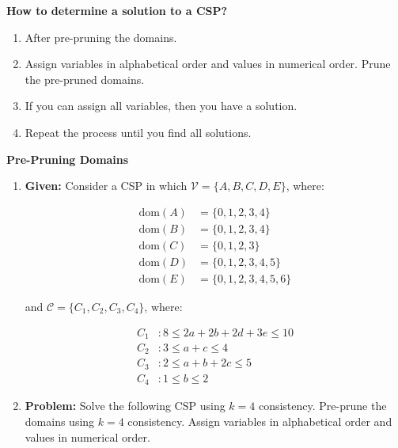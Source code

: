 \begin{process} \textbf{How to determine a solution to a CSP?}
    \begin{enumerate}
        \item After pre-pruning the domains. 
        \item Assign variables in alphabetical order and values in numerical order. Prune the pre-pruned domains.
        \item If you can assign all variables, then you have a solution.
        \item Repeat the process until you find all solutions. 
    \end{enumerate}
\end{process}
\newpage

\begin{example} \textbf{Pre-Pruning Domains}
\end{example}
\newpage

\begin{example}
    \begin{enumerate}
        \item \textbf{Given:} Consider a CSP in which $\mathcal{V} = \{A, B, C, D, E\}$, where:

        \[
        \begin{aligned}
            \text{dom}(A) &= \{0, 1, 2, 3, 4\} \\
            \text{dom}(B) &= \{0, 1, 2, 3, 4\} \\
            \text{dom}(C) &= \{0, 1, 2, 3\} \\
            \text{dom}(D) &= \{0, 1, 2, 3, 4, 5\} \\
            \text{dom}(E) &= \{0, 1, 2, 3, 4, 5, 6\} 
        \end{aligned}
        \]
        
        and $\mathcal{C} = \{C_1, C_2, C_3, C_4\}$, where:
        
        \[
        \begin{aligned}
            C_1 &: 8 \leq 2a + 2b + 2d + 3e \leq 10 \\
            C_2 &: 3 \leq a + c \leq 4 \\
            C_3 &: 2 \leq a + b + 2c \leq 5 \\
            C_4 &: 1 \leq b \leq 2
        \end{aligned}
        \]
        
        \item \textbf{Problem:} Solve the following CSP using $k = 4$ consistency. Pre-prune the domains using $k = 4$ consistency. Assign variables in alphabetical order and values in numerical order.
    \end{enumerate}
\end{example}
\newpage

